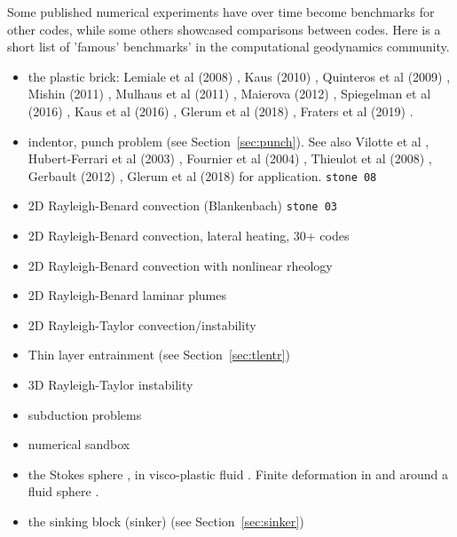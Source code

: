Some published numerical experiments have over time become benchmarks for other codes, while some 
others showcased comparisons between codes. Here is a short list of 'famous' benchmarks' in the 
computational geodynamics community.

\begin{itemize}
\item the plastic brick: Lemiale et al (2008) \cite{lemm08}, Kaus (2010) \cite{kaus10}, 
Quinteros et al (2009) \cite{qurj09}, Mishin (2011) \cite{mishin11}, Mulhaus et al (2011) \cite{muso11}, 
Maierova (2012) \cite{maie12}, Spiegelman et al (2016) \cite{spmw16}, Kaus et al (2016) \cite{kapb16}, 
Glerum et al (2018) \cite{gltf18}, Fraters et al (2019) \cite{frbt19}.
\item indentor, punch problem (see Section~\ref{sec:punch}). See also Vilotte et al \cite{vidm82,vidm84,vimd86},
Hubert-Ferrari et al (2003) \cite{hukm03}, Fournier et al (2004) \cite{fojd04}, Thieulot et al (2008) \cite{thfb08},
Gerbault (2012) \cite{gerb12}, Glerum et al (2018) \cite{gltf18}  for application. {\tt stone 08}
\item 2D Rayleigh-Benard convection (Blankenbach)  \cite{blbc89,ogaw93,trha98,chhl08,king09,lezh11,vyrc13,trab90,bepo10,chgs02} {\tt stone 03}
\item 2D Rayleigh-Benard convection, lateral heating, 30+ codes \cite{dejo83}
\item 2D Rayleigh-Benard convection with nonlinear rheology \cite{tosn15,aspectmanual}
\item 2D Rayleigh-Benard laminar plumes \cite{vavl09}
\item 2D Rayleigh-Taylor convection/instability \cite{pros81,trab90,wesc92,popo92,ogaw93,soga01,bast02,taki03,bomh06}
      \cite{basd08,qurj09,saev10,sunh10,como97,lezh11,lomw12,vyrc13,vaks97,bomh06,chtl13,deka08,mishin11,ropu19,robe19}
      \cite{maie12,fusc13,devv00a,dadh07,demh19,aspectmanual}
\item Thin layer entrainment (see Section~\ref{sec:tlentr})
\item 3D Rayleigh-Taylor instability \cite{fukk08,vosc15}
\item subduction problems \cite{spka06,scbe08,vack08,cehg14}
\item numerical sandbox \cite{bube06,bube06,maie12,busa16,gltf18}
\item the Stokes sphere \cite{galemanual,aspectmanual}, in visco-plastic fluid \cite{limd02,demj04}. 
      Finite deformation in and around a fluid sphere \cite{sccm88,crud88}.
\item the sinking block (sinker) \cite{thie11,cehg14,gery10,geyu03,mamo08,mishin11,fumt11,maie12} (see Section~\ref{sec:sinker})

\end{itemize}
